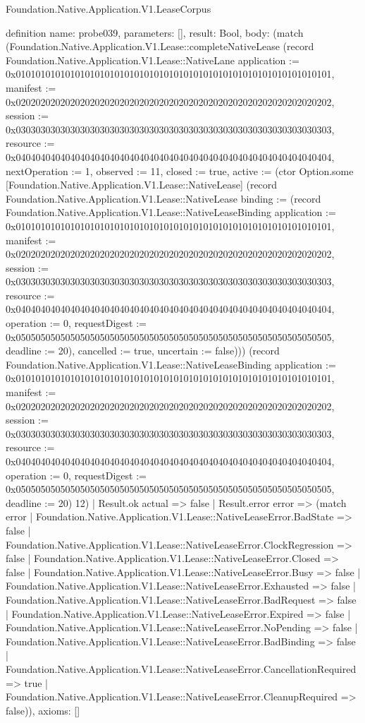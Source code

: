 \begin{lexlean}{Foundation.Native.Application.V1.LeaseCorpus}
\begin{semanticmodule}
definition{
  name: probe039,
  parameters: [],
  result: Bool,
  body: (match (Foundation.Native.Application.V1.Lease::completeNativeLease (record Foundation.Native.Application.V1.Lease::NativeLane {application := 0x0101010101010101010101010101010101010101010101010101010101010101, manifest := 0x0202020202020202020202020202020202020202020202020202020202020202, session := 0x0303030303030303030303030303030303030303030303030303030303030303, resource := 0x0404040404040404040404040404040404040404040404040404040404040404, nextOperation := 1, observed := 11, closed := true, active := (ctor Option.some [Foundation.Native.Application.V1.Lease::NativeLease] (record Foundation.Native.Application.V1.Lease::NativeLease {binding := (record Foundation.Native.Application.V1.Lease::NativeLeaseBinding {application := 0x0101010101010101010101010101010101010101010101010101010101010101, manifest := 0x0202020202020202020202020202020202020202020202020202020202020202, session := 0x0303030303030303030303030303030303030303030303030303030303030303, resource := 0x0404040404040404040404040404040404040404040404040404040404040404, operation := 0, requestDigest := 0x0505050505050505050505050505050505050505050505050505050505050505, deadline := 20}), cancelled := true, uncertain := false}))}) (record Foundation.Native.Application.V1.Lease::NativeLeaseBinding {application := 0x0101010101010101010101010101010101010101010101010101010101010101, manifest := 0x0202020202020202020202020202020202020202020202020202020202020202, session := 0x0303030303030303030303030303030303030303030303030303030303030303, resource := 0x0404040404040404040404040404040404040404040404040404040404040404, operation := 0, requestDigest := 0x0505050505050505050505050505050505050505050505050505050505050505, deadline := 20}) 12)
    | Result.ok actual => false
    | Result.error error => (match error
      | Foundation.Native.Application.V1.Lease::NativeLeaseError.BadState => false
      | Foundation.Native.Application.V1.Lease::NativeLeaseError.ClockRegression => false
      | Foundation.Native.Application.V1.Lease::NativeLeaseError.Closed => false
      | Foundation.Native.Application.V1.Lease::NativeLeaseError.Busy => false
      | Foundation.Native.Application.V1.Lease::NativeLeaseError.Exhausted => false
      | Foundation.Native.Application.V1.Lease::NativeLeaseError.BadRequest => false
      | Foundation.Native.Application.V1.Lease::NativeLeaseError.Expired => false
      | Foundation.Native.Application.V1.Lease::NativeLeaseError.NoPending => false
      | Foundation.Native.Application.V1.Lease::NativeLeaseError.BadBinding => false
      | Foundation.Native.Application.V1.Lease::NativeLeaseError.CancellationRequired => true
      | Foundation.Native.Application.V1.Lease::NativeLeaseError.CleanupRequired => false)),
  axioms: []
}


\end{semanticmodule}
\end{lexlean}
